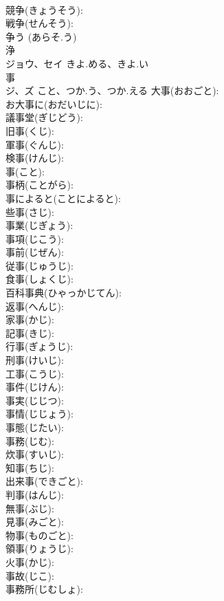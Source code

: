 \documentclass[8pt]{extreport}
\begin{document}
\begin{CJK}{UTF8}{min}
\\	競争(きょうそう): 
\\	戦争(せんそう): 
\\	争う (あらそ.う)
\\	浄			
\\	ジョウ、セイ	きよ.める、きよ.い		
\\	事			
\\	ジ、ズ	こと、つか.う、つか.える	大事(おおごと): 
\\	お大事に(おだいじに): 
\\	議事堂(ぎじどう): 
\\	旧事(くじ): 
\\	軍事(ぐんじ): 
\\	検事(けんじ): 
\\	事(こと): 
\\	事柄(ことがら): 
\\	事によると(ことによると): 
\\	些事(さじ): 
\\	事業(じぎょう): 
\\	事項(じこう): 
\\	事前(じぜん): 
\\	従事(じゅうじ): 
\\	食事(しょくじ): 
\\	百科事典(ひゃっかじてん): 
\\	返事(へんじ): 
\\	家事(かじ): 
\\	記事(きじ): 
\\	行事(ぎょうじ): 
\\	刑事(けいじ): 
\\	工事(こうじ): 
\\	事件(じけん): 
\\	事実(じじつ): 
\\	事情(じじょう): 
\\	事態(じたい): 
\\	事務(じむ): 
\\	炊事(すいじ): 
\\	知事(ちじ): 
\\	出来事(できごと): 
\\	判事(はんじ): 
\\	無事(ぶじ): 
\\	見事(みごと): 
\\	物事(ものごと): 
\\	領事(りょうじ): 
\\	火事(かじ): 
\\	事故(じこ): 
\\	事務所(じむしょ): 

\end{CJK}
\end{document}
